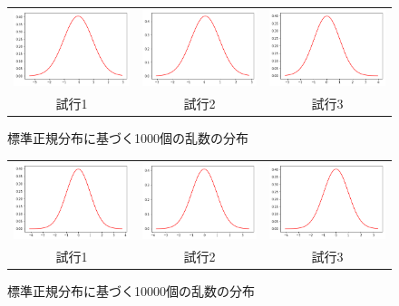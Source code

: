 \begin{figure}[h]
  \begin{center}
    \begin{tabular}{ccc}
      \includegraphics[width=0.32\hsize]{figure/1000__1.png} &
      \includegraphics[width=0.32\hsize]{figure/1000__2.png} &
      \includegraphics[width=0.32\hsize]{figure/1000__3.png} \\
      試行1 & 試行2 &試行3
    \end{tabular}
    \caption{標準正規分布に基づく1000個の乱数の分布}
    \label{figure1}
  \end{center}
\end{figure}
\begin{figure}[h]
  \begin{center}
    \begin{tabular}{ccc}
      \includegraphics[width=0.32\hsize]{figure/10000__1.png} &
      \includegraphics[width=0.32\hsize]{figure/10000__2.png} &
      \includegraphics[width=0.32\hsize]{figure/10000__3.png} \\
      試行1 & 試行2 &試行3
    \end{tabular}
    \caption{標準正規分布に基づく10000個の乱数の分布}
    \label{figure1}
  \end{center}
\end{figure}
